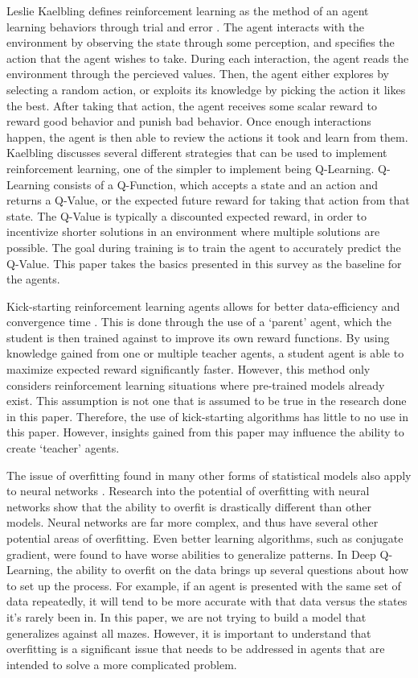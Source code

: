 \documentclass[12pt,letterpaper]{article}
\begin{document}
Leslie Kaelbling defines reinforcement learning as the method of an agent learning behaviors through trial and error \cite{article_reinforcement_learning_survey}.
The agent interacts with the environment by observing the state through some perception, and specifies the action that the agent wishes to take.
During each interaction, the agent reads the environment through the percieved values.
Then, the agent either explores by selecting a random action, or exploits its knowledge by picking the action it likes the best.
After taking that action, the agent receives some scalar reward to reward good behavior and punish bad behavior.
Once enough interactions happen, the agent is then able to review the actions it took and learn from them.
Kaelbling discusses several different strategies that can be used to implement reinforcement learning, one of the simpler to implement being Q-Learning.
Q-Learning consists of a Q-Function, which accepts a state and an action and returns a Q-Value, or the expected future reward for taking that action from that state.
The Q-Value is typically a discounted expected reward, in order to incentivize shorter solutions in an environment where multiple solutions are possible.
The goal during training is to train the agent to accurately predict the Q-Value.
This paper takes the basics presented in this survey as the baseline for the agents.

Kick-starting reinforcement learning agents allows for better data-efficiency and convergence time \cite{article_kickstart_deep_reinforcement_learning}.
This is done through the use of a `parent' agent, which the student is then trained against to improve its own reward functions.
By using knowledge gained from one or multiple teacher agents, a student agent is able to maximize expected reward significantly faster.
However, this method only considers reinforcement learning situations where pre-trained models already exist.
This assumption is not one that is assumed to be true in the research done in this paper.
Therefore, the use of kick-starting algorithms has little to no use in this paper.
However, insights gained from this paper may influence the ability to create `teacher' agents.

The issue of overfitting found in many other forms of statistical models also apply to neural networks \cite{article_overfitting_neural_networks}.
Research into the potential of overfitting with neural networks show that the ability to overfit is drastically different than other models.
Neural networks are far more complex, and thus have several other potential areas of overfitting.
Even better learning algorithms, such as conjugate gradient, were found to have worse abilities to generalize patterns.
In Deep Q-Learning, the ability to overfit on the data brings up several questions about how to set up the process.
For example, if an agent is presented with the same set of data repeatedly, it will tend to be more accurate with that data versus the states it's rarely been in.
In this paper, we are not trying to build a model that generalizes against all mazes.
However, it is important to understand that overfitting is a significant issue that needs to be addressed in agents that are intended to solve a more complicated problem.
\end{document}
